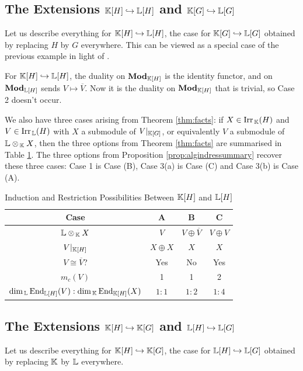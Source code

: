 \subsection{The Extensions ${\mathbb K}[H] \hookrightarrow {\mathbb L}[H]$ and ${\mathbb K}[G] \hookrightarrow {\mathbb L}[G]$}\label{sect:classicalindextwofieldextoptions} Let us describe everything for ${\mathbb K}[H] \hookrightarrow {\mathbb L}[H]$, the case for ${\mathbb K}[G] \hookrightarrow {\mathbb L}[G]$ obtained by replacing $H$ by $G$ everywhere. This can be viewed as a special case of the previous example in light of \cite[\S10]{TAYSchur}.

For ${\mathbb K}[H] \hookrightarrow {\mathbb L}[H]$, the duality on $\operatorname{\mathbf{Mod}}_{{\mathbb K}[H]}$ is the identity functor, and on $\operatorname{\mathbf{Mod}}_{{\mathbb L}[H]}$ sends $V \mapsto \overline{V}$. Now it is the duality on $\operatorname{\mathbf{Mod}}_{{\mathbb K}[H]}$ that is trivial, so Case 2 doesn't occur.

We also have three cases arising from Theorem \ref{thm:facts}: if $X \in \operatorname{Irr}_{\, {\mathbb K}}(H)$ and $V \in \operatorname{Irr}_{\, {\mathbb L}}(H)$ with $X$ a submodule of $V|_{{\mathbb K}[G]}$, or equivalently $V$ a submodule of ${\mathbb L} \otimes_{\, {\mathbb K}} X$, then the three options from Theorem \ref{thm:facts} are summarised in Table \ref{tab:thewaysLHSsquare}. The three options from Proposition \ref{prop:algindressummary} recover these three cases: Case 1 is Case (B), Case 3(a) is Case (C) and Case 3(b) is Case (A).

\begin{table}
\caption{Induction and Restriction Possibilities Between ${\mathbb K}[H]$ and ${\mathbb L}[H]$}
\label{tab:thewaysLHSsquare}
\begin{center}
\def\arraystretch{1.3}
\begin{tabular}{ c c c c } 
    \toprule
Case & \textbf{A} & \textbf{B} & \textbf{C} \\
\midrule
 ${\mathbb L} \otimes_{\, {\mathbb K}} X$ & $V$ & $V \oplus \overline{V}$ & $V \oplus V$ \\ 
 $V|_{{\mathbb K}[H]}$ & $X \oplus X$ & $X$ & $X$\\ 
 $V \cong \overline{V}$? & Yes & No & Yes \\ 
  $m_c(V)$ & 1 & 1 & 2 \\
  $\dim_{\, {\mathbb L}} \operatorname{End}_{{\mathbb L}[H]}(V) : \dim_{\, {\mathbb K}} \operatorname{End}_{{\mathbb K}[H]}(X)$ & $1:1$ & $1:2$ & $1:4$ \\ 
  \bottomrule
\end{tabular}
\end{center} 
\end{table}

\subsection{The Extensions ${\mathbb K}[H] \hookrightarrow {\mathbb K}[G]$ and ${\mathbb L}[H] \hookrightarrow {\mathbb L}[G]$}\label{sect:indextwosubgroup}
Let us describe everything for ${\mathbb K}[H] \hookrightarrow {\mathbb K}[G]$, the case for ${\mathbb L}[H] \hookrightarrow {\mathbb L}[G]$ obtained by replacing ${\mathbb K}$ by ${\mathbb L}$ everywhere.

